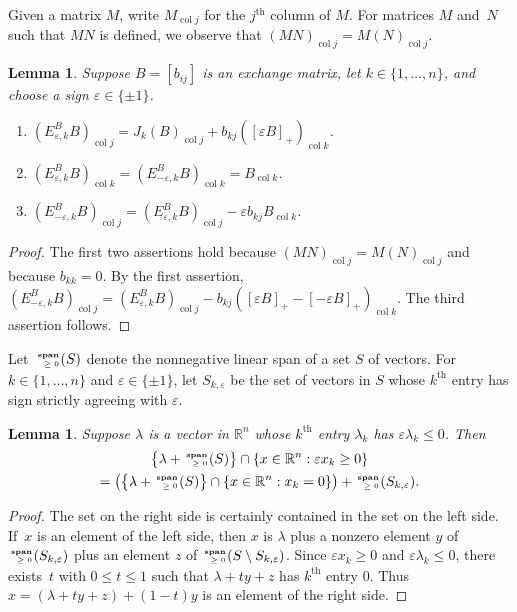 \documentclass[10pt]{article}
\newtheorem{lemma}[proposition]{Lemma}
\theoremstyle{definition}
\theoremstyle{remark}
\numberwithin{equation}{section}
\newcommand{\reals}{\mathbb R}
\newcommand{\ep}{\varepsilon}
\newcommand{\col}{\operatorname{col}}
\newcommand{\sgn}{\operatorname{sgn}}
\newcommand{\nnspan}{{\!\!\tiny\begin{array}{r}\mathbf{span}\\\ge0\end{array}\hspace*{-0.57em}}}
\newcommand{\set}[1]{{\lbrace #1 \rbrace}}
\newcommand{\sett}[1]{{\bigl\lbrace #1 \bigr\rbrace}}
\renewcommand{\th}{^\text{th}}
\newcommand{\0}{{\mathbf{0}}}
\renewcommand{\th}{^\text{th}}
\begin{document}
Given a matrix $M$, write $M_{\col j}$ for the $j\th$ column of $M$.
For matrices $M$ and~$N$ such that $MN$ is defined, we observe that $(MN)_{\col j}=M(N)_{\col j}$.
\begin{lemma}\label{columns lem}
Suppose $B=[b_{ij}]$ is an exchange matrix, let $k\in\set{1,\ldots,n}$, and choose a sign $\ep\in\set{\pm1}$.
\begin{enumerate}[label=\bf\arabic*., ref=\arabic*]
\item \label{col j}
$(E_{\ep,k}^BB)_{\col j}=J_k(B)_{\col j}+b_{kj}([\ep B]_+)_{\col k}$.
\item \label{col k}
$(E_{\ep,k}^BB)_{\col k}=(E_{-\ep,k}^BB)_{\col k}=B_{\col k}$.
\item \label{cols k}
$(E_{-\ep,k}^BB)_{\col j}=(E_{\ep,k}^BB)_{\col j}-\ep b_{kj}B_{\col k}$.
\end{enumerate}
\end{lemma}
\begin{proof}
The first two assertions hold because $(MN)_{\col j}=M(N)_{\col j}$ and because $b_{kk}=0$.
By the first assertion, $(E_{-\ep,k}^BB)_{\col j}=(E_{\ep,k}^BB)_{\col j}-b_{kj}([\ep B]_+-[-\ep B]_+)_{\col k}$.  
The third assertion follows.
\end{proof}

Let~$\nnspan(S)$ denote the nonnegative linear span of a set $S$ of vectors.
For ${k\in\set{1,\ldots,n}}$ and $\ep\in\set{\pm1}$, let $S_{k,\ep}$ be the set of vectors in $S$ whose $k\th$ entry has sign strictly agreeing with $\ep$.

\begin{lemma}\label{ps lemma}
Suppose $\lambda$ is a vector in $\reals^n$ whose $k\th$ entry $\lambda_k$ has $\ep\lambda_k\le0$.
Then %
\begin{multline*}
\sett{\lambda+\nnspan(S)}\cap\set{x\in\reals^n:\ep x_k\ge0}\\
=\bigl(\sett{\lambda+\nnspan(S)}\cap\set{x\in\reals^n:x_k=0}\bigr)+\nnspan(S_{k,\ep}).
\end{multline*}
\end{lemma}
\begin{proof}
The set on the right side is certainly contained in the set on the left side.
If~$x$ is an element of the left side, then $x$ is $\lambda$ plus a nonzero element $y$ of $\nnspan(S_{k,\ep})$ plus an element $z$ of $\nnspan(S\setminus S_{k,\ep})$.
Since $\ep x_k\ge0$ and $\ep\lambda_k\le0$, there exists~$t$ with ${0\le t\le1}$ such that $\lambda+ty+z$ has $k\th$ entry $0$.
Thus ${x=(\lambda+ty+z)+(1-t)y}$ is an element of the right side.
\end{proof}
\end{document}
